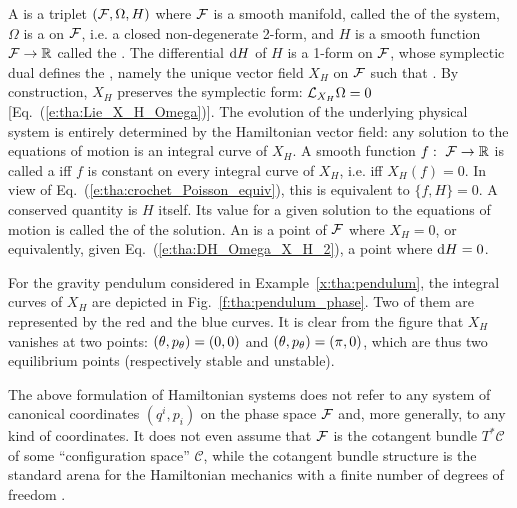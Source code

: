 \begin{prop}
\label{p:tha:Hamiltonian_system}
A 
is a triplet $(\mathcal{F},\Omega,H)$ where $\mathcal{F}$ is a smooth
manifold, called the  of the system, $\Omega$ is
a  on $\mathcal{F}$, i.e. a closed non-degenerate
2-form, and $H$ is a smooth function $\mathcal{F} \to \mathbb{R}$ called
the .
The differential $\mathrm{d} H$ of $H$ is a 1-form  on
$\mathcal{F}$, whose symplectic dual defines
the ,
namely the unique vector field $X_H$
on $\mathcal{F}$ such that
\be \label{e:tha:DH_Omega_X_H_2}
.
\ee
By construction, $X_H$ preserves the symplectic
form: $\mathcal{L}_{X_H} \Omega = 0$ [Eq.~(\ref{e:tha:Lie_X_H_Omega})].
The evolution of the underlying physical system is entirely determined
by the Hamiltonian vector field: any solution to the equations of motion
is an integral curve of $X_H$.
A smooth function $f: \ \mathcal{F} \to \mathbb{R}$ is called a
 iff $f$ is constant on every integral curve
of $X_H$, i.e. iff $X_H(f) = 0$. In view of Eq.~(\ref{e:tha:crochet_Poisson_equiv}),
this is equivalent to $\{f,H\} = 0$.
A conserved quantity is $H$ itself. Its value for a given solution to the equations of motion
is called the  of the solution.
An  is a point of $\mathcal{F}$ where $X_H = 0$,
or equivalently, given Eq.~(\ref{e:tha:DH_Omega_X_H_2}), a point where
$\mathrm{d} H = 0$.
\end{prop}

\begin{example}
For the gravity pendulum considered in Example~\ref{x:tha:pendulum},
the integral curves of $X_H$ are depicted in Fig.~\ref{f:tha:pendulum_phase}.
Two of them are
represented by the red and the blue curves. It is clear from the figure
that $X_H$ vanishes at two points: $(\theta,p_\theta) = (0,0)$ and $(\theta,p_\theta) = (\pi,0)$,
which are thus two equilibrium points (respectively stable and unstable).
\end{example}


\begin{remark}
The above formulation of Hamiltonian systems does not
refer to any system of canonical coordinates $(q^i, p_i)$ on
the phase space $\mathcal{F}$
and, more generally, to any kind of coordinates.
It does not even assume that $\mathcal{F}$ is the cotangent bundle $T^*\mathcal{C}$
of some ``configuration space'' $\mathcal{C}$,
while the cotangent bundle structure is the standard
arena for the Hamiltonian mechanics with a finite number of degrees
of freedom \cite{AbrahM78}.
\end{remark}

